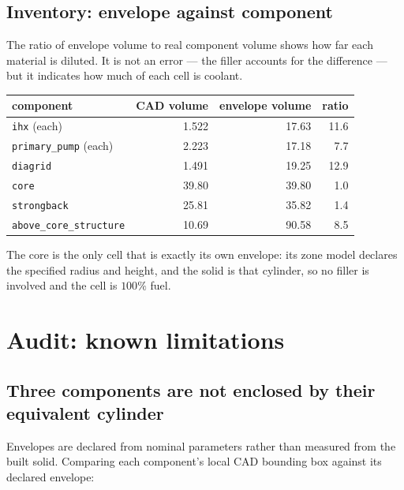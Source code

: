 \documentclass[9pt,a4paper]{extarticle}
\newcommand{\code}[1]{\texttt{\small #1}}
\begin{document}
\subsection{Inventory: envelope against component}

The ratio of envelope volume to real component volume shows how far each
material is diluted. It is not an error --- the filler accounts for the
difference --- but it indicates how much of each cell is coolant.

\begin{center}
\begin{tabular}{@{}lrrr@{}}
\toprule
component & CAD volume & envelope volume & ratio \\
\midrule
\code{ihx} (each) & 1.522 & 17.63 & 11.6 \\
\code{primary\_pump} (each) & 2.223 & 17.18 & 7.7 \\
\code{diagrid} & 1.491 & 19.25 & 12.9 \\
\code{core} & 39.80 & 39.80 & 1.0 \\
\code{strongback} & 25.81 & 35.82 & 1.4 \\
\code{above\_core\_structure} & 10.69 & 90.58 & 8.5 \\
\bottomrule
\end{tabular}
\end{center}

\noindent
The core is the only cell that is exactly its own envelope: its zone model
declares the specified radius and height, and the solid is that cylinder, so no
filler is involved and the cell is $100\%$ fuel.

\section{Audit: known limitations}
\label{sec:audit}

\subsection{Three components are not enclosed by their equivalent cylinder}
\label{sec:overhang}

Envelopes are declared from nominal parameters rather than measured from the
built solid. Comparing each component's local CAD bounding box against its
declared envelope:
\end{document}
